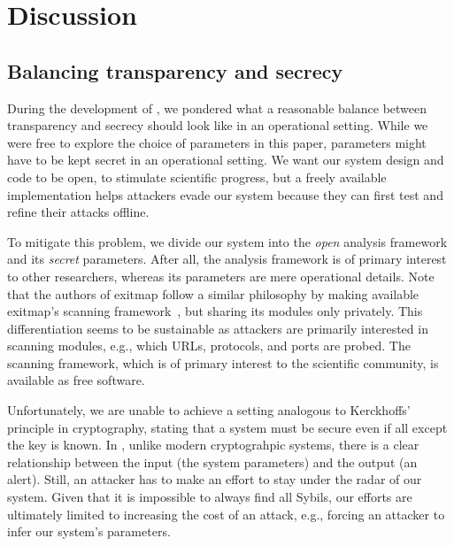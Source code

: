 \section{Discussion}
\label{sec:discussion}

\subsection{Balancing transparency and secrecy}
\label{sec:secrecy}
During the development of \sys, we pondered what a reasonable balance
between transparency and secrecy should look like in an operational setting.
While we were free to explore the choice of \sys parameters in this
paper, parameters might have to be kept secret in an operational setting.  We
want our system design and code to be open, to stimulate scientific progress,
but a freely available implementation helps attackers evade our system because
they can first test and refine their attacks offline.

To mitigate this problem, we divide our system into the \emph{open} analysis
framework and its \emph{secret} parameters.  After all, the analysis framework
is of primary interest to other researchers, whereas its parameters are mere
operational details.  Note that the authors of exitmap follow a similar
philosophy by making available exitmap's scanning framework~\cite{exitmap}, but
sharing its modules only privately.  This differentiation seems to be
sustainable as attackers are primarily interested in scanning modules, e.g.,
which URLs, protocols, and ports are probed.  The scanning framework, which is
of primary interest to the scientific community, is available as free software.

Unfortunately, we are unable to achieve a setting analogous to Kerckhoffs'
principle in cryptography, stating that a system must be secure even if all
except the key is known.  In \sys, unlike modern cryptograhpic systems,
there is a clear relationship between the input (the system parameters) and the
output (an alert).  Still, an attacker has to make an effort to stay under the
radar of our system.  Given that it is impossible to always find all Sybils, our
efforts are ultimately limited to increasing the cost of an attack, e.g.,
forcing an attacker to infer our system's parameters.

